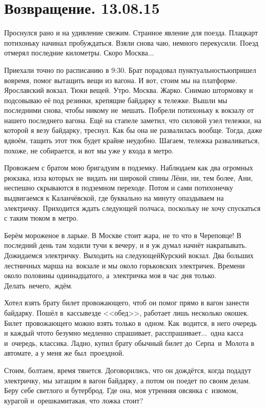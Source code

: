 \chapter{Возвращение. 13.08.15}

Проснулся рано и на удивление свежим. Странное явление для поезда. Плацкарт потихоньку начинал пробуждаться. Взяли снова чаю, немного перекусили. Поезд отмерял последние километры. Скоро Москва$\ldots$

Приехали точно по расписанию в 9:30. Брат порадовал пунктуальностью\mdash пришел вовремя, помог вытащить вещи из вагона. И вот, стоим мы на платформе. Ярославский вокзал. Тюки вещей. Утро. Москва. Жарко. Снимаю штормовку и подсовываю её под резинки, крепящие байдарку к тележке. Вышли мы последними снова, чтобы никому не~мешать. Побрели потихоньку к вокзалу от нашего последнего вагона. Ещё на стапеле заметил, что силовой узел тележки, на которой я везу байдарку, треснул. Как бы она не развалилась вообще. Тогда, даже вдвоём, тащить этот тюк будет крайне неудобно. Шагаем, тележка разваливаться, похоже, не собирается, и вот мы уже у входа в метро. 

Провожаем с братом мою бригаду\mdash им в подземку. Наблюдаем как два огромных рюкзака, из\sdash за которых не~видать ни широкой спины Лёни, ни, тем более, Ани, неспешно скрываются в подземном переходе. Потом и сами потихонечку выдвигаемся к Каланчёвской, где буквально на минуту опаздываем на электричку. Приходится ждать следующей полчаса, поскольку не хочу спускаться с таким тюком в метро. 

Берём мороженое в ларьке. В Москве стоит жара, не то что в Череповце! В последний день там ходили тучи к вечеру, и я уж думал начнёт накрапывать. Дожидаемся электричку. Выходить на следующей\mdash Курский вокзал. Два больших лестничных марша на~вокзале и мы около горьковских электричек. Времени около половины одиннадцатого, а~электричка моя в час дня только. Делать~нечего,~ждём. 

Хотел взять брату билет провожающего, чтоб он помог прямо в вагон занести байдарку. Пошёл в~кассы\mdash везде <<обед>>, работает лишь несколько окошек. Билет~провожающего можно взять только в~одном. Как~водится, в него очередь и каждый что\sdash то безумно медленно спрашивает, расспрашивает$\ldots$~одна касса и~очередь, классика. Ладно, купил брату обычный билет до~Серпа~и~Молота в автомате, а у меня же был~проездной. 

Стоим, болтаем, время тянется. Договорились, что он дождётся, когда подадут электричку, мы затащим в вагон байдарку, а потом он поедет по своим делам. Беру себе светлого и бутерброд. Где она, моя утренняя овсянка с~изюмом, курагой и~орешками\mdash такая, что ложка стоит? 

